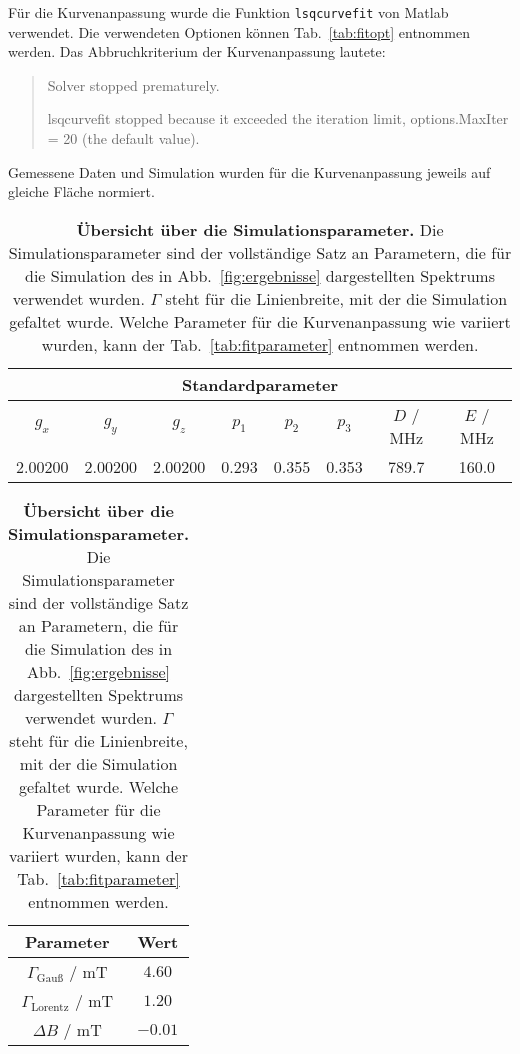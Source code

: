 \documentclass{article}
\newcommand{\matlab}{\textsf{Matlab}}
\begin{document}
\clearpage


Für die Kurvenanpassung wurde die Funktion \texttt{lsqcurvefit} von \matlab{} verwendet. Die verwendeten Optionen können Tab.~\ref{tab:fitopt} entnommen werden. Das Abbruchkriterium der Kurvenanpassung lautete:

\begin{quote}\small
\ttfamily
Solver stopped prematurely.

lsqcurvefit stopped because it exceeded the iteration limit,
options.MaxIter = 20 (the default value).
\end{quote}

Gemessene Daten und Simulation wurden für die Kurvenanpassung jeweils auf gleiche Fläche normiert.

\begin{table}[h]
\caption{\textbf{Übersicht über die Simulationsparameter.} Die Simulationsparameter sind der vollständige Satz an Parametern, die für die Simulation des in Abb.~\ref{fig:ergebnisse} dargestellten Spektrums verwendet wurden. $\Gamma$ steht für die Linienbreite, mit der die Simulation gefaltet wurde. Welche Parameter für die Kurvenanpassung wie variiert wurden, kann der Tab.~\ref{tab:fitparameter} entnommen werden.}
\label{tab:simparameter}
\centering
\begin{tabular}{cccccccc} 
\toprule
\multicolumn{8}{c}{\textbf{Standardparameter} }
\\
\midrule 
$g_x$      & $g_y$      & $g_z$      & $p_1$   & $p_2$   & $p_3$   & $D$ / MHz & $E$ / MHz \\
2.00200 & 2.00200 & 2.00200 & 0.293 & 0.355 & 0.353 &   789.7  &   160.0     \\ 
\bottomrule
\end{tabular}

\begin{tabular}{cc}
\toprule
\textbf{Parameter} & \textbf{Wert}
\\
\midrule

$\Gamma_\text{Gauß}$ / mT & $4.60$
\\

$\Gamma_\text{Lorentz}$ / mT & $1.20$
\\

$\Delta B$ / mT & $-0.01$
\\

\bottomrule
\end{tabular}
\end{table}
\end{document}
